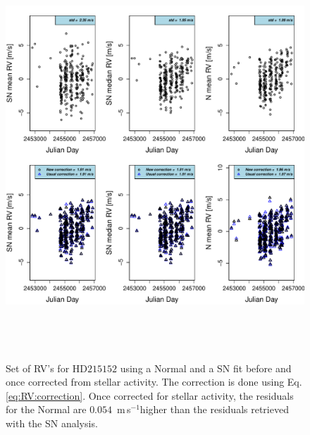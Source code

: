 \documentclass{aa}
\def\ms{\hbox{\,m\,s$^{-1}$}}         %
\begin{document}
\begin{figure} 
\begin{center}
\includegraphics[height = 6in]{NEW_CORRECTIONHD21515_[3]CorrectionActivity_RadialVelocity_vs_time.pdf} 
   \caption{Set of RV's for $\text{HD}215152$ using a Normal and a SN fit before and once corrected from stellar activity. The correction is done using Eq. \ref{eq:RV:correction}. Once corrected for stellar activity, the residuals for the Normal are $0.054$ \ms higher than the residuals retrieved with the SN analysis.}
   \label{fig:HD215152:correctionRV}
\end{center}
\end{figure}
\end{document}
